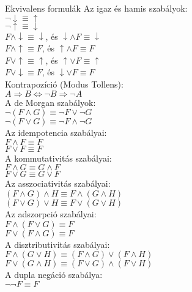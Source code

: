 \documentclass{beamer}
\begin{document}
\begin{frame}
\begin{block}{Ekvivalens formulák}
Az igaz és hamis szabályok:\\
${\neg}\downarrow \equiv \uparrow$\\
${\neg}\uparrow \equiv \downarrow$\\
$F \land \downarrow \equiv \downarrow$, és $\downarrow \land F \equiv \downarrow$\\
$F \land \uparrow \equiv F$, és $\uparrow \land F \equiv F$\\
$F \lor \uparrow \equiv \uparrow$, és $\uparrow \lor F \equiv \uparrow$\\
$F \lor \downarrow \equiv F$, és $\downarrow \lor F \equiv F$\\
\smallskip
Kontrapozíció (Modus Tollens):\\
$A \Rightarrow B \iff {\neg}B \Rightarrow {\neg}A$\\
\smallskip
A de Morgan szabályok:\\
${\neg}(F \land G) \equiv {\neg}F \lor {\neg}G$\\
${\neg}(F \lor G) \equiv {\neg}F \land {\neg}G$\\
\smallskip
Az idempotencia szabályai:\\
$F \land F \equiv F$\\
$F \lor F \equiv F$\\
\smallskip
A kommutativitás szabályai:\\
$F \land G \equiv G \land F$\\
$F \lor G \equiv G \lor F$\\
\smallskip
Az asszociativitás szabályai:\\
$(F \land G) \land H \equiv F \land (G \land H)$\\
$(F \lor G) \lor H \equiv F \lor (G \lor H)$\\
\smallskip
Az adszorpció szabályai:\\
$F \land (F \lor G) \equiv F$\\
$F \lor (F \land G) \equiv F$\\
\smallskip
A disztributivitás szabályai:\\
$F \land (G \lor H) \equiv (F \land G) \lor (F \land H)$\\
$F \lor (G \land H) \equiv (F \lor G) \land (F \lor H)$\\
\smallskip
A dupla negáció szabálya:\\
${\neg}{\neg}F \equiv F$
\end{block}

\end{frame}
\end{document}
